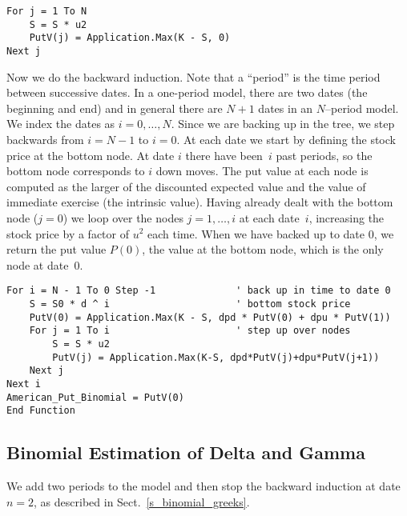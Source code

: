 \small\begin{verbatim}
For j = 1 To N
    S = S * u2
    PutV(j) = Application.Max(K - S, 0)
Next j
\end{verbatim}\normalsize

Now we do the backward induction.  Note that a ``period'' is the time period between successive dates.  In a one-period model, there are two dates (the beginning and end) and in general there are $N+1$ dates in an $N$--period model.  We index the dates as $i=0,\ldots,N$.  Since we are backing up in the tree, we step backwards from $i=N-1$ to $i=0$.  At each date we start by defining the stock price at the bottom node.  At date $i$ there have been~$i$ past periods, so the bottom node corresponds to $i$ down moves.  The put value at each node is computed as the larger of the discounted expected value and the value of immediate exercise (the intrinsic value).  Having already dealt with the bottom node ($j=0$) we loop over the nodes $j=1,\ldots,i$ at each date~$i$, increasing the stock price by a factor of $u^2$ each time.  When we have backed up to date 0, we return the put value $P(0)$, the value at the bottom node, which is the only node at date~0.


\small\begin{verbatim}
For i = N - 1 To 0 Step -1              ' back up in time to date 0
    S = S0 * d ^ i                      ' bottom stock price
    PutV(0) = Application.Max(K - S, dpd * PutV(0) + dpu * PutV(1))
    For j = 1 To i                      ' step up over nodes
        S = S * u2
        PutV(j) = Application.Max(K-S, dpd*PutV(j)+dpu*PutV(j+1))
    Next j
Next i
American_Put_Binomial = PutV(0)         
End Function
\end{verbatim}\normalsize

\subsection*{Binomial Estimation of Delta and Gamma}

We add two periods to the model and then stop the backward induction at date $n=2$, as described in Sect.~\ref{s_binomial_greeks}.


